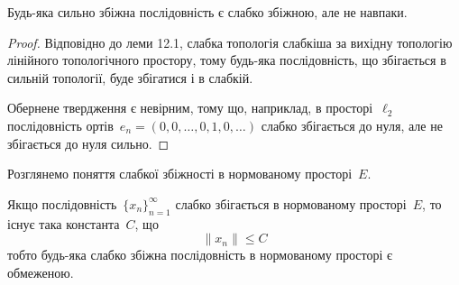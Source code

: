 \begin{lemma}
Будь-яка сильно збіжна послідовність є слабко
збіжною, але не навпаки.
\end{lemma}

\begin{proof}
Відповідно до леми 12.1, слабка топологія
слабкіша за вихідну топологію лінійного топологічного
простору, тому будь-яка послідовність, що збігається в
сильній топології, буде збігатися і в слабкій.

Обернене твердження є невірним, тому що, наприклад, в
просторі~$\ell_2$ послідовність ортів~$e_n = (0, 0, \dots, 0, 1, 0, \dots)$ слабко
збігається до нуля, але не збігається до нуля сильно. 
\end{proof}

Розглянемо поняття слабкої збіжності в нормованому
просторі~$E$.

\begin{theorem}
Якщо послідовність~$\{x_n\}_{n = 1}^\infty$
слабко збігається в нормованому просторі~$E$, то існує така
константа~$C$, що
\begin{equation*}
    \|x_n\| \le C
\end{equation*}
тобто будь-яка слабко збіжна послідовність в нормованому
просторі є обмеженою.
\end{theorem}

